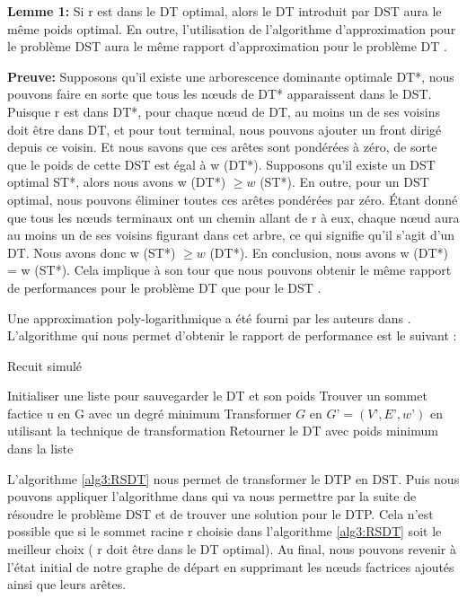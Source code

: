 \textbf{Lemme 1:}
Si r est dans le DT optimal, alors le DT introduit par DST aura le même poids optimal. En outre, l’utilisation de l’algorithme d’approximation pour le problème DST aura le même rapport d’approximation pour le problème DT \cite{shin2010approximation}.

\textbf{Preuve:}
Supposons qu'il existe une arborescence dominante optimale DT*, nous pouvons faire en sorte que tous les nœuds de DT* apparaissent dans le DST. Puisque r est dans DT*, pour chaque nœud de DT, au moins un de ses voisins doit être dans DT, et pour tout terminal, nous pouvons ajouter un front dirigé depuis ce voisin. Et nous savons que ces arêtes sont pondérées à zéro, de sorte que le poids de cette DST est égal à w (DT*). Supposons qu'il existe un DST optimal ST*, alors nous avons w (DT*) $\geq w$ (ST*). En outre, pour un DST optimal, nous pouvons éliminer toutes ces arêtes pondérées par zéro. Étant donné que tous les nœuds terminaux ont un chemin allant de r à eux, chaque nœud aura au moins un de ses voisins figurant dans cet arbre, ce qui signifie qu’il s’agit d’un DT. Nous avons donc w (ST*) $ \geq w$ (DT*). En conclusion, nous avons w (DT*) = w (ST*). Cela implique à son tour que nous pouvons obtenir le même rapport de performances pour le problème DT que pour le DST \cite{shin2010approximation}.

Une approximation poly-logarithmique a été fourni par les auteurs dans \cite{charikar1999approximation}.  L’algorithme qui  nous permet d’obtenir le rapport de performance est le suivant :\\

\begin{algorithm}[H]
\label{alg3:RSDT}
\caption{Recuit simulé}
\SetAlgoLined
\DontPrintSemicolon
\large


Initialiser une liste pour sauvegarder le DT et son poids \;
Trouver un sommet factice u en G avec un degré minimum \;
Transformer $G$ en $G’ = (V’, E’, w’)$ en utilisant la technique de transformation\;
 Retourner le DT avec poids minimum dans la liste \;
\end{algorithm}


L’algorithme \ref{alg3:RSDT} nous permet de transformer le DTP en DST. Puis nous pouvons appliquer l’algorithme dans \cite{charikar1999approximation} qui va nous permettre par la suite de résoudre le problème DST et de trouver une solution pour le DTP. Cela n’est possible que si le sommet racine r choisie dans l’algorithme \ref{alg3:RSDT} soit le meilleur choix ( r doit être dans le DT optimal). Au final, nous pouvons revenir à l’état initial de  notre graphe de départ en supprimant les nœuds factrices ajoutés ainsi que leurs arêtes. 


